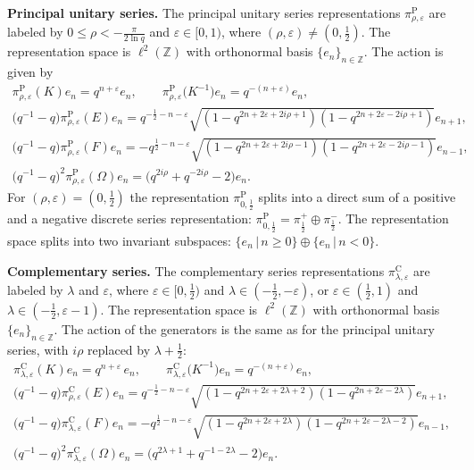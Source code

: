 \documentclass[pdftex]{sigma}
\numberwithin{equation}{section}
\numberwithin{theorem}{section}
\numberwithin{proposition}{section}
\numberwithin{lemma}{section}
\numberwithin{corollary}{section}
\numberwithin{definition}{section}
\numberwithin{example}{section}
\numberwithin{remark}{section}
\numberwithin{note}{section}
\newcommand{\Z}{\mathbb Z}
\newcommand{\eps}{\varepsilon}
\begin{document}
\textbf{Principal unitary series.} The principal unitary series
representations $\pi^{\mathrm P}_{\rho,\eps}$ are labeled by $0\leq\rho <
-\frac{\pi}{2\ln q}$ and $\eps \in [0,1)$, where $(\rho,\eps)
\neq (0,\frac12)$. The representation space is $\ell^2(\Z)$ with
orthonormal basis $\{e_n\}_{n \in \Z}$. The action is given by
\begin{gather}
\pi^{\mathrm P}_{\rho,\eps}(K) e_n = q^{n+\eps} e_n, \qquad
\pi^{\mathrm P}_{\rho,\eps} \big(K^{-1}\big) e_n = q^{-(n+\eps)}e_n,\nonumber\\
\big(q^{-1}-q\big)\pi^{\mathrm P}_{\rho,\eps}(E) e_n = q^{-\frac12-n-\eps} \sqrt{(1-q^{2n+2\eps+2i\rho+1})
(1-q^{2n+2\eps-2i\rho+1})} e_{n+1},
\nonumber\\
\big(q^{-1}-q\big)\pi^{\mathrm P}_{\rho,\eps}(F) e_n = -q^{\frac12-n-\eps}
\sqrt{(1-q^{2n+2\eps+2i\rho-1}) (1-q^{2n+2\eps-2i\rho-1})} e_{n-1},
\nonumber\\
\big(q^{-1}-q\big)^2 \pi^{\mathrm P}_{\rho,\eps} (\Omega) e_n
=\big(q^{2i\rho}+q^{-2i\rho} -2\big) e_n.\label{eq:princ}
\end{gather}
For $(\rho,\eps)= (0,\frac12)$ the representation $\pi^{\mathrm P}_{0,\frac12}$ splits into a direct
sum of a positive and a negative discrete series representation: $\pi^{\mathrm P}_{0,\frac12}= \pi^+_\frac12
\oplus \pi^-_\frac12$. The representation space splits into two invariant subspaces: $\{ e_n\, | \, n \geq 0 \} \oplus \{e_n \, |\,
n<0 \}$.

\textbf{Complementary series.} The complementary series
representations $\pi^{\mathrm C}_{\lambda,\eps}$ are labeled by $\lambda$ and
$\eps$, where $\eps \in [0,\frac12)$ and $\lambda \in (-\frac12,-\eps)$, or
$\eps \in (\frac12,1)$ and $\lambda \in (-\frac12, \eps-1)$. The
representation space is $\ell^2(\Z)$ with orthonormal basis
$\{e_n\}_{n \in \Z}$. The action of the generators is the same as for the principal unitary series, with $i\rho$ replaced by $\lambda+\frac12$:
\begin{gather}
\pi^{\mathrm C}_{\lambda,\eps}(K) e_n = q^{n+\eps}\, e_n, \qquad
\pi^{\mathrm C}_{\lambda,\eps} \big(K^{-1}\big) e_n = q^{-(n+\eps)}e_n,\nonumber\\
\big(q^{-1}-q\big)\pi^{\mathrm C}_{\rho,\eps}(E) e_n
= q^{-\frac12-n-\eps} \sqrt{(1-q^{2n+2\eps+2\lambda+2})
(1-q^{2n+2\eps-2\lambda})} e_{n+1},
\nonumber\\
\big(q^{-1}-q\big)\pi^{\mathrm C}_{\lambda,\eps}(F) e_n = -q^{\frac12-n-\eps}
\sqrt{(1-q^{2n+2\eps+2\lambda}) (1-q^{2n+2\eps-2\lambda-2})} e_{n-1},\nonumber\\
\big(q^{-1}-q\big)^2 \pi^{\mathrm C}_{\lambda,\eps} (\Omega) e_n
=\big(q^{2\lambda+1}+q^{-1-2\lambda} -2\big) e_n.\label{eq:comp}
\end{gather}
\end{document}
